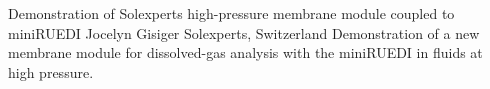 \begin{conf-abstract}
{Demonstration of Solexperts high-pressure membrane module coupled to miniRUEDI}
{Jocelyn Gisiger}
{Solexperts, Switzerland}
{Demonstration of a new membrane module for dissolved-gas analysis with the miniRUEDI in fluids at high pressure.}
\end{conf-abstract}
